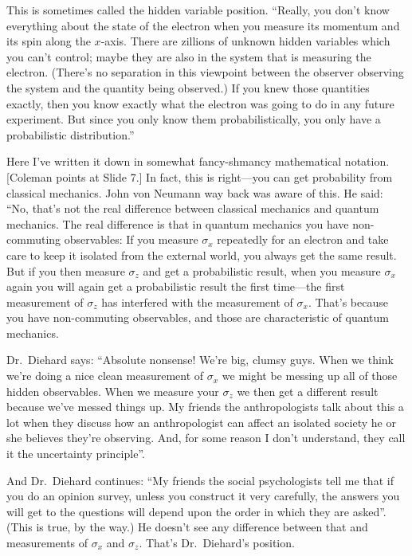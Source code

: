 \documentclass[12pt,nofootinbib]{revtex4}
\begin{document}
This is sometimes called the hidden variable position.  ``Really, you don't know everything about the state of the electron when you measure its momentum and its spin along the $x$-axis. There are zillions of unknown hidden variables which you can't control; maybe they are also in the system that is measuring the electron. (There's no separation in this viewpoint between the observer observing the system and the quantity being observed.) If you knew those quantities exactly, then you know exactly what the electron was going to do in any future experiment. But since you only know them probabilistically, you only have a probabilistic distribution.''

Here I've written it down in somewhat fancy-shmancy mathematical notation. [Coleman points at Slide 7.]  In fact, this is right---you can get probability from classical mechanics. John von Neumann way back was aware of this. He said: ``No, that's not the real difference between classical mechanics and quantum mechanics. The real difference is that in quantum mechanics you have non-commuting observables:  If you measure $\sigma_x$ repeatedly for an electron and take care to keep it isolated from the external world, you always get the same result.  But if you then measure $\sigma_z$ and get a probabilistic result, when you measure $\sigma_x$ again you will again get a probabilistic result the first time---the first measurement of $\sigma_z$ has interfered with the measurement of $\sigma_x$. That's because you have non-commuting observables, and those are characteristic of quantum mechanics.

Dr.\ Diehard says: ``Absolute nonsense! We're big, clumsy guys. When we think we're doing a nice clean measurement of $\sigma_x$ we might be messing up all of those hidden observables. When we measure your $\sigma_z$ we then get a different result because we've messed things up. My friends the anthropologists talk about this a lot when they discuss how an anthropologist can affect an isolated society he or she believes they're observing. And, for some reason I don't understand, they call it the uncertainty principle''.

And Dr.\ Diehard continues: ``My friends the social psychologists tell me that if you do an opinion survey, unless you construct it very carefully, the answers you will get to the questions will depend upon the order in which they are asked''. (This is true, by the way.) He doesn't see any difference between that and measurements of $\sigma_x$ and $\sigma_z$. That's Dr.\ Diehard's position.
\end{document}
